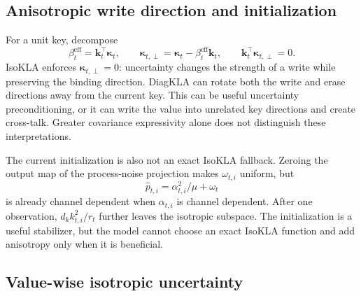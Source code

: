 \documentclass[11pt]{article}
\newcommand{\vct}[1]{\boldsymbol{#1}}
\begin{document}
\subsection{Anisotropic write direction and initialization}

For a unit key, decompose
\begin{equation}
  \beta_t^{\mathrm{eff}}=\vct{k}_t^\top\vct{\kappa}_t,
  \qquad
  \vct{\kappa}_{t,\perp}
  = \vct{\kappa}_t-\beta_t^{\mathrm{eff}}\vct{k}_t,
  \qquad
  \vct{k}_t^\top\vct{\kappa}_{t,\perp}=0.
  \label{eq:discussion-gain-decomposition}
\end{equation}
IsoKLA enforces $\vct{\kappa}_{t,\perp}=0$: uncertainty changes the strength of a write while
preserving the binding direction. DiagKLA can rotate both the write and erase directions away
from the current key. This can be useful uncertainty preconditioning, or it can write the value
into unrelated key directions and create cross-talk. Greater covariance expressivity alone does
not distinguish these interpretations.

The current initialization is also not an exact IsoKLA fallback. Zeroing the output map of the
process-noise projection makes $\omega_{t,i}$ uniform, but
\begin{equation}
  \widehat p_{t,i}=\alpha_{t,i}^2/\mu+\omega_t
\end{equation}
is already channel dependent when $\alpha_{t,i}$ is channel dependent. After one observation,
$d_k k_{t,i}^2/r_t$ further leaves the isotropic subspace. The initialization is a useful
stabilizer, but the model cannot choose an exact IsoKLA function and add anisotropy only when it
is beneficial.

\subsection{Value-wise isotropic uncertainty}
\label{subsec:discussion-value-isotropic}
\end{document}
